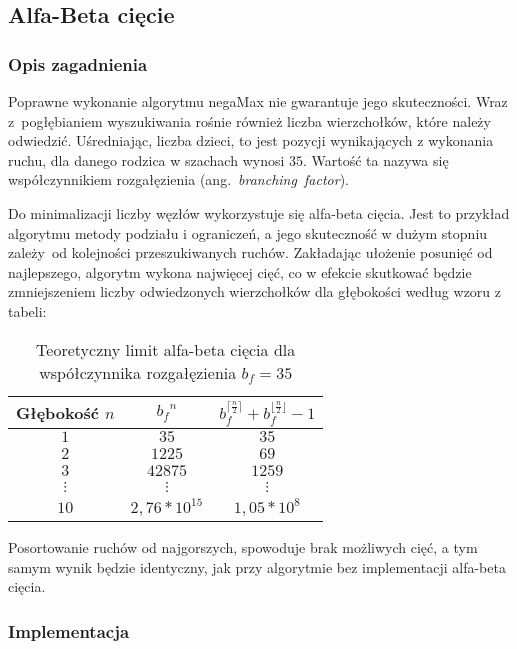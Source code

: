 \subsection{Alfa-Beta cięcie}
\label{subsec:alfa-beta-ciecie}
\subsubsection{Opis zagadnienia}
Poprawne wykonanie algorytmu negaMax nie gwarantuje jego skuteczności.
Wraz z~pogłębianiem wyszukiwania rośnie również liczba wierzchołków, które należy odwiedzić.
Uśredniając, liczba dzieci, to jest pozycji wynikających z wykonania ruchu, dla danego rodzica w szachach wynosi $35$. \cite*{branching-factor}
Wartość ta nazywa się współczynnikiem rozgałęzienia (ang.~\textit{branching~factor}).

Do minimalizacji liczby węzłów wykorzystuje się alfa-beta cięcia.
Jest to przykład algorytmu metody podziału i ograniczeń, a jego skuteczność w dużym stopniu zależy~od kolejności przeszukiwanych ruchów.
Zakładając ułożenie posunięć od najlepszego, algorytm wykona najwięcej cięć, co w efekcie skutkować będzie zmniejszeniem liczby odwiedzonych wierzchołków dla głębokości według wzoru z tabeli:

\begin{table}[htb] \small
\centering
\caption{Teoretyczny limit alfa-beta cięcia dla współczynnika rozgałęzienia $b_f = 35$}
\label{tab:alfa-beat}
\renewcommand{\arraystretch}{1.5}
\begin{tabular}{|c|c|c|}\hline
Głębokość $n$ & ${b_{f}}^{n}$ & $b_{f}^{\lceil \frac{n}{2} \rceil} + b_{f}^{\lfloor \frac{n}{2} \rfloor} - 1$\\ \hline\hline

$1$ & $35$ & $35$\\ \hline
$2$ & $1225$ & $69$\\ \hline
$3$ & $42 875$ & $1259$\\ \hline
$\vdots$ & $\vdots$ & $\vdots$\\ \hline
$10$ & $2,76 * 10^{15}$ & $1,05 * 10^{8}$\\ \hline

\end{tabular}
\end{table}

Posortowanie ruchów od najgorszych, spowoduje brak możliwych cięć, a tym samym wynik będzie identyczny, jak przy algorytmie bez implementacji alfa-beta cięcia.


\subsubsection{Implementacja}

